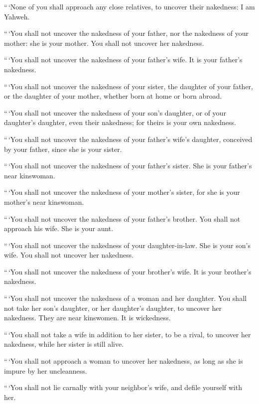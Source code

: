  ``\,`None of you shall approach any close relatives, to
uncover their nakedness: I am Yahweh.

 ``\,`You shall not uncover the nakedness of your father,
nor the nakedness of your mother: she is your mother. You shall not
uncover her nakedness.

 ``\,`You shall not uncover the nakedness of your father's
wife. It is your father's nakedness.

 ``\,`You shall not uncover the nakedness of your sister,
the daughter of your father, or the daughter of your mother, whether
born at home or born abroad.

 ``\,`You shall not uncover the nakedness of your son's
daughter, or of your daughter's daughter, even their nakedness; for
theirs is your own nakedness.

 ``\,`You shall not uncover the nakedness of your father's
wife's daughter, conceived by your father, since she is your sister.

 ``\,`You shall not uncover the nakedness of your father's
sister. She is your father's near kinswoman.

 ``\,`You shall not uncover the nakedness of your mother's
sister, for she is your mother's near kinswoman.

 ``\,`You shall not uncover the nakedness of your father's
brother. You shall not approach his wife. She is your aunt.

 ``\,`You shall not uncover the nakedness of your
daughter-in-law. She is your son's wife. You shall not uncover her
nakedness.

 ``\,`You shall not uncover the nakedness of your brother's
wife. It is your brother's nakedness.

 ``\,`You shall not uncover the nakedness of a woman and
her daughter. You shall not take her son's daughter, or her daughter's
daughter, to uncover her nakedness. They are near kinswomen. It is
wickedness.

 ``\,`You shall not take a wife in addition to her sister,
to be a rival, to uncover her nakedness, while her sister is still
alive.

 ``\,`You shall not approach a woman to uncover her
nakedness, as long as she is impure by her uncleanness.

 ``\,`You shall not lie carnally with your neighbor's wife,
and defile yourself with her.

